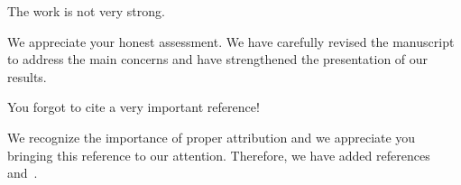 
\begin{revcomment}
    The work is not very strong.
\end{revcomment}
\begin{revresponse}
    We appreciate your honest assessment. We have carefully revised the manuscript to address the main concerns and have strengthened the presentation of our results.
\end{revresponse}

\begin{revcomment}
    You forgot to cite a very important reference!
\end{revcomment}
\begin{revresponse}
    We recognize the importance of proper attribution and we appreciate you bringing this reference to our attention. Therefore, we have added references~\cite{C_CVPR_he2016deep} and~\cite{C_NeurIPS_vaswani2017attention}.
\end{revresponse}
